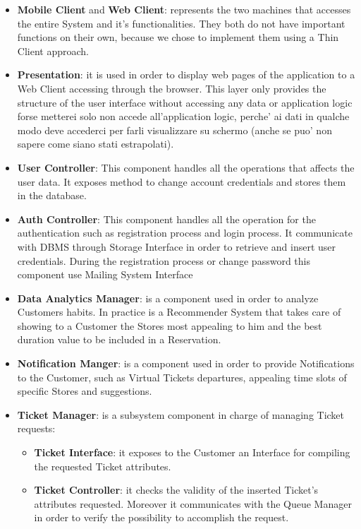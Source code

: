 \documentclass[a4paper, 12pt, oneside, table]{article}
\newcommand*{\lorenzo}[1]{\textcolor{BurntOrange}{#1}}
\begin{document}
\begin{itemize}
    \item \label{cv:client}\textbf{Mobile Client} and \textbf{Web Client}: represents the two machines that accesses the entire System and it's functionalities. They both do not have important functions on their own, because we chose to implement them using a Thin Client approach.
    \item \textbf{Presentation}: it is used in order to display web pages of the application to a Web Client accessing through the browser. This layer only provides the structure of the user interface without accessing any data or application logic \lorenzo{forse metterei solo non accede all'application logic, perche' ai dati in qualche modo deve accederci per farli visualizzare su schermo (anche se puo' non sapere come siano stati estrapolati)}.
    \item \textbf{User Controller}: This component handles all the operations that affects the user data. It exposes method to change account credentials and stores them in the database.
    \item \textbf{Auth Controller}: This component handles all the operation for the authentication such as registration process and login process. It communicate with DBMS through Storage Interface in order to retrieve and insert user credentials. During the registration process or change password this component use Mailing System Interface
    \item \textbf{Data Analytics Manager}: is a component used in order to analyze Customers habits. In practice is a Recommender System that takes care of showing to a Customer the Stores most appealing to him and the best duration value to be included in a Reservation.
    \item \textbf{Notification Manger}: is a component used in order to provide Notifications to the Customer, such as  Virtual Tickets departures, appealing time slots of specific Stores and suggestions.
    \item \textbf{Ticket Manager}: is a subsystem component in charge of managing Ticket requests:
    \begin{itemize}
        \item \textbf{Ticket Interface}: it exposes to the Customer an Interface for compiling the requested Ticket attributes.
        \item \textbf{Ticket Controller}: it checks the validity of the inserted Ticket's attributes requested. Moreover it communicates with the Queue Manager in order to verify the possibility to accomplish the request.

\end{itemize}
\end{itemize}
\end{document}
